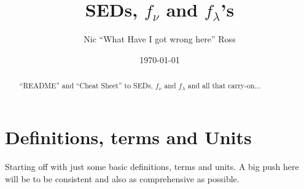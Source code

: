 \documentclass[11pt,a4paper]{article}
\begin{document}
\title{SEDs, $f_{\nu}$ and $f_{\lambda}$'s}
\author{Nic ``What Have I got wrong here'' Ross}
\date{\today}
\maketitle



\begin{abstract}
``README'' and ``Cheat Sheet'' to SEDs, $f_{\nu}$ and $f_{\lambda}$
and all that carry-on...
\end{abstract}



\clearpage
\section{Definitions, terms and Units}
Starting off with just some basic definitions, terms and units. A big
push here will be to be consistent and also as comprehensive as
possible.
\end{document}
